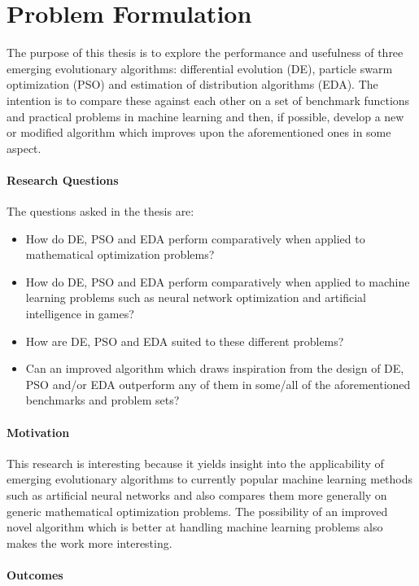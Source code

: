 \section{Problem Formulation}

The purpose of this thesis is to explore the performance and usefulness of three emerging evolutionary algorithms: differential evolution (DE), particle swarm optimization (PSO) and estimation of distribution algorithms (EDA). The intention is to compare these against each other on a set of benchmark functions and practical problems in machine learning and then, if possible, develop a new or modified algorithm which improves upon the aforementioned ones in some aspect.

\paragraph{Research Questions}

The questions asked in the thesis are:
\begin{itemize}
  \item How do DE, PSO and EDA perform comparatively when applied to mathematical optimization problems?
  \item How do DE, PSO and EDA perform comparatively when applied to machine learning problems such as neural network optimization and artificial intelligence in games?
  \item How are DE, PSO and EDA suited to these different problems?
  \item Can an improved algorithm which draws inspiration from the design of DE, PSO and/or EDA outperform any of them in some/all of the aforementioned benchmarks and problem sets?
\end{itemize}

\paragraph{Motivation}

This research is interesting because it yields insight into the applicability of emerging evolutionary algorithms to currently popular machine learning methods such as artificial neural networks and also compares them more generally on generic mathematical optimization problems. The possibility of an improved novel algorithm which is better at handling machine learning problems also makes the work more interesting.

\paragraph{Outcomes}

